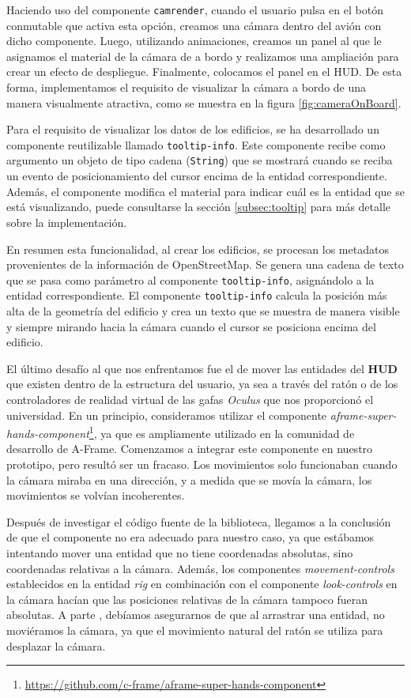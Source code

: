 \documentclass[a4paper, 11pt]{book}
\begin{document}
Haciendo uso del componente \texttt{camrender}, cuando el usuario pulsa en el botón conmutable que activa esta opción, creamos una cámara dentro del avión con dicho componente. Luego, utilizando animaciones, creamos un panel al que le asignamos el material de la cámara de a bordo y realizamos una ampliación para crear un efecto de despliegue. Finalmente, colocamos el panel en el HUD. De esta forma, implementamos el requisito de visualizar la cámara a bordo de una manera visualmente atractiva, como se muestra en la figura \ref{fig:cameraOnBoard}.

Para el requisito de visualizar los datos de los edificios, se ha desarrollado un componente reutilizable llamado \texttt{tooltip-info}. Este componente recibe como argumento un objeto de tipo cadena (\texttt{String}) que se mostrará cuando se reciba un evento de posicionamiento del cursor encima de la entidad correspondiente. Además, el componente modifica el material para indicar cuál es la entidad que se está visualizando, puede consultarse la sección \ref{subsec:tooltip} para más detalle sobre la implementación.

En resumen esta funcionalidad, al crear los edificios, se procesan los metadatos provenientes de la información de OpenStreetMap. Se genera una cadena de texto que se pasa como parámetro al componente \texttt{tooltip-info}, asignándolo a la entidad correspondiente. El componente \texttt{tooltip-info} calcula la posición más alta de la geometría del edificio y crea un texto que se muestra de manera visible y siempre mirando hacia la cámara cuando el cursor se posiciona encima del edificio.

El último desafío al que nos enfrentamos fue el de mover las entidades del \textbf{HUD} que existen dentro de la estructura del usuario, ya sea a través del ratón o de los controladores de realidad virtual de las gafas \emph{Oculus} que nos proporcionó el universidad. En un principio, consideramos utilizar el componente \emph{aframe-super-hands-component}\footnote{\url{https://github.com/c-frame/aframe-super-hands-component}}, ya que es ampliamente utilizado en la comunidad de desarrollo de A-Frame. Comenzamos a integrar este componente en nuestro prototipo, pero resultó ser un fracaso. Los movimientos solo funcionaban cuando la cámara miraba en una dirección, y a medida que se movía la cámara, los movimientos se volvían incoherentes.

Después de investigar el código fuente de la biblioteca, llegamos a la conclusión de que el componente no era adecuado para nuestro caso, ya que estábamos intentando mover una entidad que no tiene coordenadas absolutas, sino coordenadas relativas a la cámara. Además, los componentes \emph{movement-controls} establecidos en la entidad \emph{rig} en combinación con el componente \emph{look-controls} en la cámara hacían que las posiciones relativas de la cámara tampoco fueran absolutas. A parte , debíamos asegurarnos de que al arrastrar una entidad, no moviéramos la cámara, ya que el movimiento natural del ratón se utiliza para desplazar la cámara.
\end{document}
